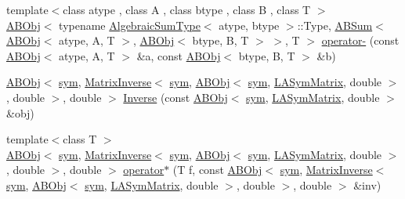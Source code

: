 \begin{DoxyCompactItemize}
\item 
{\footnotesize template$<$class atype , class A , class btype , class B , class T $>$ }\\\mbox{\hyperlink{classROOT_1_1Minuit2_1_1ABObj}{A\+B\+Obj}}$<$ typename \mbox{\hyperlink{classROOT_1_1Minuit2_1_1AlgebraicSumType}{Algebraic\+Sum\+Type}}$<$ atype, btype $>$\+::Type, \mbox{\hyperlink{classROOT_1_1Minuit2_1_1ABSum}{A\+B\+Sum}}$<$ \mbox{\hyperlink{classROOT_1_1Minuit2_1_1ABObj}{A\+B\+Obj}}$<$ atype, A, T $>$, \mbox{\hyperlink{classROOT_1_1Minuit2_1_1ABObj}{A\+B\+Obj}}$<$ btype, B, T $>$ $>$, T $>$ \mbox{\hyperlink{namespaceROOT_1_1Minuit2_ad72d0b214406e2325a87fe10b052b9ad}{operator-\/}} (const \mbox{\hyperlink{classROOT_1_1Minuit2_1_1ABObj}{A\+B\+Obj}}$<$ atype, A, T $>$ \&a, const \mbox{\hyperlink{classROOT_1_1Minuit2_1_1ABObj}{A\+B\+Obj}}$<$ btype, B, T $>$ \&b)
\item 
\mbox{\hyperlink{classROOT_1_1Minuit2_1_1ABObj}{A\+B\+Obj}}$<$ \mbox{\hyperlink{classROOT_1_1Minuit2_1_1sym}{sym}}, \mbox{\hyperlink{classROOT_1_1Minuit2_1_1MatrixInverse}{Matrix\+Inverse}}$<$ \mbox{\hyperlink{classROOT_1_1Minuit2_1_1sym}{sym}}, \mbox{\hyperlink{classROOT_1_1Minuit2_1_1ABObj}{A\+B\+Obj}}$<$ \mbox{\hyperlink{classROOT_1_1Minuit2_1_1sym}{sym}}, \mbox{\hyperlink{classROOT_1_1Minuit2_1_1LASymMatrix}{L\+A\+Sym\+Matrix}}, double $>$, double $>$, double $>$ \mbox{\hyperlink{namespaceROOT_1_1Minuit2_ad9e57aa2fbebb59a130d5c7cc8df6bd2}{Inverse}} (const \mbox{\hyperlink{classROOT_1_1Minuit2_1_1ABObj}{A\+B\+Obj}}$<$ \mbox{\hyperlink{classROOT_1_1Minuit2_1_1sym}{sym}}, \mbox{\hyperlink{classROOT_1_1Minuit2_1_1LASymMatrix}{L\+A\+Sym\+Matrix}}, double $>$ \&obj)
\item 
{\footnotesize template$<$class T $>$ }\\\mbox{\hyperlink{classROOT_1_1Minuit2_1_1ABObj}{A\+B\+Obj}}$<$ \mbox{\hyperlink{classROOT_1_1Minuit2_1_1sym}{sym}}, \mbox{\hyperlink{classROOT_1_1Minuit2_1_1MatrixInverse}{Matrix\+Inverse}}$<$ \mbox{\hyperlink{classROOT_1_1Minuit2_1_1sym}{sym}}, \mbox{\hyperlink{classROOT_1_1Minuit2_1_1ABObj}{A\+B\+Obj}}$<$ \mbox{\hyperlink{classROOT_1_1Minuit2_1_1sym}{sym}}, \mbox{\hyperlink{classROOT_1_1Minuit2_1_1LASymMatrix}{L\+A\+Sym\+Matrix}}, double $>$, double $>$, double $>$ \mbox{\hyperlink{namespaceROOT_1_1Minuit2_af2850fcb007d2b85ed4285233e01f7cb}{operator$\ast$}} (T f, const \mbox{\hyperlink{classROOT_1_1Minuit2_1_1ABObj}{A\+B\+Obj}}$<$ \mbox{\hyperlink{classROOT_1_1Minuit2_1_1sym}{sym}}, \mbox{\hyperlink{classROOT_1_1Minuit2_1_1MatrixInverse}{Matrix\+Inverse}}$<$ \mbox{\hyperlink{classROOT_1_1Minuit2_1_1sym}{sym}}, \mbox{\hyperlink{classROOT_1_1Minuit2_1_1ABObj}{A\+B\+Obj}}$<$ \mbox{\hyperlink{classROOT_1_1Minuit2_1_1sym}{sym}}, \mbox{\hyperlink{classROOT_1_1Minuit2_1_1LASymMatrix}{L\+A\+Sym\+Matrix}}, double $>$, double $>$, double $>$ \&inv)

\end{DoxyCompactItemize}
